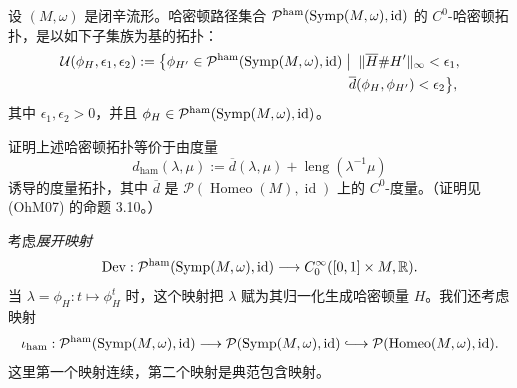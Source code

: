 \begin{definition}
\label{def:c0-hamiltonian-topology}
设 $(M,\omega)$ 是闭辛流形。哈密顿路径集合
$\mathcal P^{\mathrm{ham}}(\operatorname{Symp}(M,\omega),\operatorname{id})$
的 $C^0$-哈密顿拓扑，是以如下子集族为基的拓扑：
\[
\begin{split}
 \mathcal U(\phi_H,\epsilon_1,\epsilon_2):={}&
 \bigl\{\phi_{H'}\in
 \mathcal P^{\mathrm{ham}}(\Symp(M,\omega),\operatorname{id})\mathrel{\big|}\;
 \|\overline H\#H'\|_\infty<\epsilon_1,\\
 &\hspace{48mm}
 \overline d(\phi_H,\phi_{H'})<\epsilon_2\bigr\},
\end{split}
\]
其中 $\epsilon_1,\epsilon_2>0$，并且
$\phi_H\in\mathcal P^{\mathrm{ham}}(\operatorname{Symp}(M,\omega),\operatorname{id})$。
\end{definition}

\begin{exercise}\label{ex:c0-hamiltonian-metric-topology}
证明上述哈密顿拓扑等价于由度量
\[
 d_{\mathrm{ham}}(\lambda,\mu)
 :=\overline d(\lambda,\mu)+\operatorname{leng}(\lambda^{-1}\mu)
\]
诱导的度量拓扑，其中 $\overline d$ 是
$\mathcal P(\operatorname{Homeo}(M),\operatorname{id})$ 上的
$C^0$-度量。（证明见 (OhM07) 的命题 3.10。）
\end{exercise}

考虑\emph{展开映射}
\[
 \operatorname{Dev}:\mathcal P^{\mathrm{ham}}
 (\operatorname{Symp}(M,\omega),\operatorname{id})
 \longrightarrow C_0^\infty([0,1]\times M,\mathbb R).
\]
当 $\lambda=\phi_H:t\mapsto\phi_H^t$ 时，这个映射把
$\lambda$ 赋为其归一化生成哈密顿量 $H$。我们还考虑映射
\[
 \iota_{\mathrm{ham}}:\mathcal P^{\mathrm{ham}}
 (\Symp(M,\omega),\operatorname{id})
 \longrightarrow\mathcal P(\Symp(M,\omega),\operatorname{id})
 \lhook\joinrel\longrightarrow
 \mathcal P(\operatorname{Homeo}(M,\omega),\operatorname{id}).
\]
这里第一个映射连续，第二个映射是典范包含映射。

